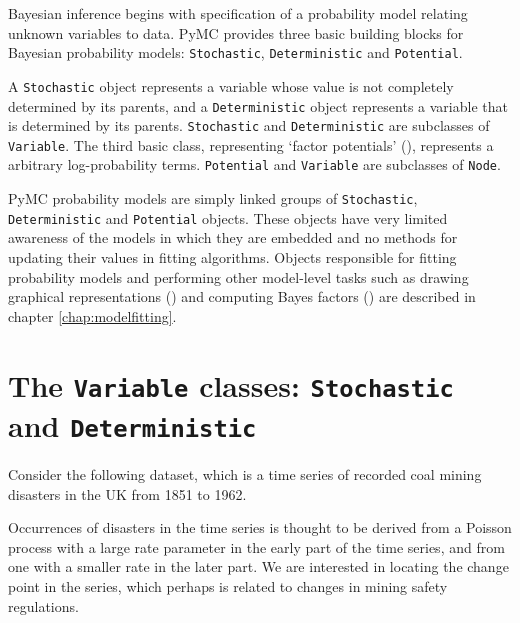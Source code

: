 
Bayesian inference begins with specification of a probability model relating unknown variables to data. PyMC provides three basic building blocks for Bayesian probability models: \texttt{Stochastic}, \texttt{Deterministic} and \texttt{Potential}. 

A \texttt{Stochastic} object represents a variable whose value is not completely determined by its parents, and a \texttt{Deterministic} object represents a variable that is determined by its parents. \texttt{Stochastic} and \texttt{Deterministic} are subclasses of \texttt{Variable}. The third basic class, representing `factor potentials' (\cite{dawidmarkov,jordangraphical}), represents a arbitrary log-probability terms. \texttt{Potential} and \texttt{Variable} are subclasses of \texttt{Node}.


\medskip
PyMC probability models are simply linked groups of \texttt{Stochastic}, \texttt{Deterministic} and \texttt{Potential} objects. These objects have very limited awareness of the models in which they are embedded and no methods for updating their values in fitting algorithms. Objects responsible for fitting probability models and performing other model-level tasks such as drawing graphical representations (\cite{dawidmarkov,jordangraphical}) and computing Bayes factors (\cite{gelman}) are described in chapter \ref{chap:modelfitting}.


\section{The \texttt{Variable} classes: \texttt{Stochastic} and \texttt{Deterministic}}
Consider the following dataset, which is a time series of recorded coal mining disasters in the UK from 1851 to 1962.
\begin{center}
\end{center}
Occurrences of disasters in the time series is thought to be derived from a Poisson process with a large rate parameter in the early part of the time series, and from one with a smaller rate in the later part. We are interested in locating the change point in the series, which perhaps is related to changes in mining safety regulations.

